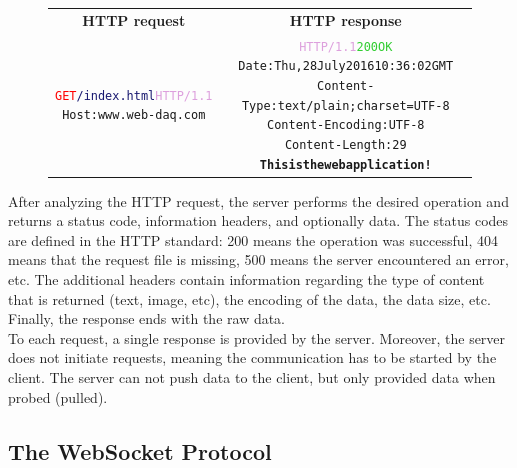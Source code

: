       \begin{figure}[h!]
        \begin{tabularx}{\textwidth}{C{1}C{1}}
          \textbf{HTTP request} & \textbf{HTTP response} \\
        { \footnotesize
\begin{alltt}
\textcolor{Red}{GET} \textcolor{MidnightBlue}{/index.html} \textcolor{Plum}{HTTP/1.1} \newline
\textcolor{BurntOrange}{Host:} www.web-daq.com
\end{alltt} } & { \footnotesize
\begin{alltt}
\textcolor{Plum}{HTTP/1.1} \textcolor{LimeGreen}{200 OK} \newline
\textcolor{BurntOrange}{Date:} Thu, 28 July 2016 10:36:02 GMT \newline
\textcolor{BurntOrange}{Content-Type:} text/plain; charset=UTF-8 \newline
\textcolor{BurntOrange}{Content-Encoding:} UTF-8 \newline
\textcolor{BurntOrange}{Content-Length:} 29 \newline
\textbf{This is the web application !}
\end{alltt} }
        \end{tabularx}
        \caption{}
        \label{fig:III-2-http}
      \end{figure}

      After analyzing the HTTP request, the server performs the desired operation and returns a status code, information headers, and optionally data. The status codes are defined in the HTTP standard: 200 means the operation was successful, 404 means that the request file is missing, 500 means the server encountered an error, etc. The additional headers contain information regarding the type of content that is returned (text, image, etc), the encoding of the data, the data size, etc. Finally, the response ends with the raw data. \\

      To each request, a single response is provided by the server. Moreover, the server does not initiate requests, meaning the communication has to be started by the client. The server can not push data to the client, but only provided data when probed (pulled).

    \subsection{The WebSocket Protocol}

